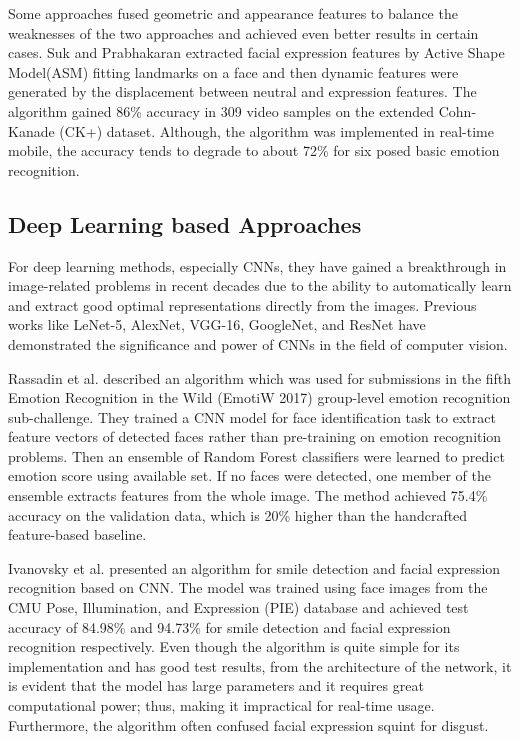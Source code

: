 \documentclass[master]{thesis-uestc}
\begin{document}
Some approaches fused geometric and appearance features to balance the weaknesses of the two approaches and achieved even better results in certain cases. Suk and Prabhakaran\cite{MSu14} extracted facial expression features by Active Shape Model(ASM) fitting landmarks on a face and then dynamic features were generated by the displacement between neutral and expression features. The algorithm gained 86\% accuracy in 309 video samples on the extended Cohn-Kanade (CK+) dataset\cite{5543262}. Although, the algorithm was implemented in real-time mobile, the accuracy tends to degrade to about 72\% for six posed basic emotion recognition.

\subsection{Deep Learning based Approaches}
For deep learning methods, especially CNNs, they have gained a breakthrough in image-related problems in recent decades due to the ability to automatically learn and extract good optimal representations directly from the images. Previous works like LeNet-5\cite{YLe98}, AlexNet\cite{Kri12}, VGG-16\cite{Kar14}, GoogleNet\cite{Chr14}, and ResNet\cite{Kai15} have demonstrated the significance and power of CNNs in the field of computer vision.

Rassadin et al.\cite{DBLP:journals/corr/abs-1709-01688} described an algorithm which was used for submissions in the fifth Emotion Recognition in the Wild (EmotiW 2017) group-level emotion recognition sub-challenge. They trained a CNN model for face identification task to extract feature vectors of detected faces rather than pre-training on emotion recognition problems. Then an ensemble of Random Forest classifiers were learned to predict emotion score using available set. If no faces were detected, one member of the ensemble extracts features from the whole image. The method achieved 75.4\% accuracy on the validation data, which is 20\% higher than the handcrafted feature-based baseline.

Ivanovsky et al.\cite{Ivanovsky-2017} presented an algorithm for smile detection and facial expression recognition based on CNN. The model was trained using face images from the CMU Pose, Illumination, and Expression (PIE) database\cite{Sim-2003-8822} and achieved test accuracy of 84.98\% and 94.73\% for smile detection and facial expression recognition respectively. Even though the algorithm is quite simple for its implementation and has good test results, from the architecture of the network, it is evident that the model has large parameters and it requires great computational power; thus, making it impractical for real-time usage. Furthermore, the algorithm often confused facial expression squint for disgust.
\end{document}
